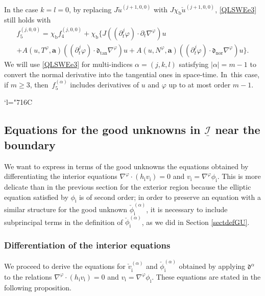 \documentclass[10pt]{amsart}
\newcommand{\Changelback}{\mathcode`l="716C}
\newcommand{\dtan}{{\mathfrak d}_\mathrm{tan}}
\newcommand{\dnor}{{\mathfrak d}_\mathrm{nor}}
\newcommand{\dt}{\partial_t}
\newcommand{\cI}{{\mathcal I}}
\newcommand{\ul}[1]{\underline{#1}}
\theoremstyle{definition}
\begin{document}
In the case $k=l=0$, by replacing $J\check{u}^{(j+1,0,0)}$ with $J\chi_\mathrm{b}\check{u}^{(j+1,0,0)}$, \eqref{QLSWEe3} still holds with
\begin{multline*}
f_5^{(j,0,0)}
= \chi_\mathrm{b}f_4^{(j,0,0)} + \chi_\mathrm{b} \{ J((\dt^j\varphi)\cdot\dt\nabla^\varphi)u \\
+ A(u,T^\varphi,\bm{a})((\dt^j\varphi)\cdot\dtan\nabla^\varphi)u
+ A(u,N^\varphi,\bm{a})((\dt^j\varphi)\cdot\dnor\nabla^\varphi)u \}.
\end{multline*}
We will use \eqref{QLSWEe3} for multi-indices $\alpha=(j,k,l)$ satisfying $|\alpha|=m-1$ to convert the normal derivative into the tangential ones in space-time. In~this case, if $m\geq3$, then~$f_5^{(\alpha)}$ includes derivatives of $u$ and $\varphi$ up to at most order $m-1$.

\Changelback

\subsection{Equations for the good unknowns in $\ul{\cI}$ near the boundary}\label{sectnearbdry}
We want to express in terms of the good unknowns the equations obtained by differentiating the interior equations $\nabla^\varphi\cdot(h_\mathrm{i}v_\mathrm{i})=0$
and $v_\mathrm{i}=\nabla^\varphi\phi_\mathrm{i}$.
This is more delicate than in the previous section for the exterior region because the elliptic equation satisfied by $\phi_\mathrm{i}$ is of second order;
in order to preserve an equation with a similar structure for the good unknown $\check\phi_\mathrm{i}^{(\alpha)}$,
it is necessary to include subprincipal terms in the definition of $\check\phi_\mathrm{i}^{(\alpha)}$, as we did in Section \ref{sectdefGU}.

\subsubsection{Differentiation of the interior equations}
We proceed to derive the equations for $\check{v}_\mathrm{i}^{(\alpha)}$ and $\check{\phi}_\mathrm{i}^{(\alpha)}$
obtained by applying $\mathfrak{d}^\alpha$ to the relations $\nabla^\varphi\cdot (h_\mathrm{i}v_\mathrm{i})=0$ and $v_\mathrm{i}=\nabla^\varphi \phi_\mathrm{i}$.
These equations are stated in the following proposition.
\end{document}
